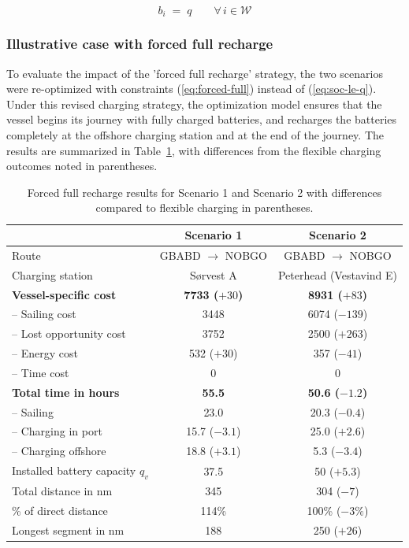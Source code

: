 \begin{equation}
b_{i} \;=\; q \qquad \forall\, i\in\mathcal{W}
\label{eq:forced-full}
\end{equation}

\subsubsection{Illustrative case with forced full recharge}
\label{sec:forced-full-case}

To evaluate the impact of the 'forced full recharge' strategy, the two scenarios were re-optimized with constraints (\ref{eq:forced-full}) instead of (\ref{eq:soc-le-q}). Under this revised charging strategy, the optimization model ensures that the vessel begins its journey with fully charged batteries, and recharges the batteries completely at the offshore charging station and at the end of the journey. The results are summarized in Table~\ref{tab:forced-results}, with differences from the flexible charging outcomes noted in parentheses.

\begin{table}[H]
\centering
\caption{Forced full recharge results for Scenario 1 and Scenario 2 with differences compared to flexible charging in parentheses.}
\label{tab:forced-results}
\begin{tabular}{@{}lcc@{}}
\toprule
 & \textbf{Scenario 1} & \textbf{Scenario 2} \\
\midrule
Route                            & GBABD $\rightarrow$ NOBGO & GBABD $\rightarrow$ NOBGO \\
Charging station                 & Sørvest A & Peterhead (Vestavind E) \\
\textbf{Vessel-specific cost}    & \textbf{7733 ($+30$)} & \textbf{8931 ($+83$)} \\
\quad -- Sailing cost            & 3448 & 6074 ($-139$) \\
\quad -- Lost opportunity cost   & 3752 & 2500 ($+263$) \\
\quad -- Energy cost             & 532 ($+30$) & 357 ($-41$) \\
\quad -- Time cost               & 0 & 0 \\
\textbf{Total time in hours}     & \textbf{55.5} & \textbf{50.6 ($-1.2$)} \\
\quad -- Sailing                 & 23.0 & 20.3 ($-0.4$) \\
\quad -- Charging in port        & 15.7 ($-3.1$) & 25.0 ($+2.6$) \\
\quad -- Charging offshore       & 18.8 ($+3.1$) & 5.3 ($-3.4$) \\
Installed battery capacity $q_{v}$ & 37.5 & 50 ($+5.3$) \\
Total distance in nm             & 345 & 304 ($-7$) \\
\% of direct distance            & 114\% & 100\% ($-3\%$) \\
Longest segment in nm            & 188 & 250 ($+26$) \\
\bottomrule
\end{tabular}
\end{table}


